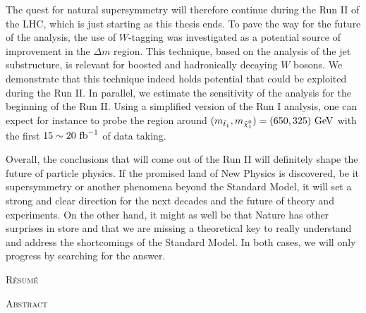 The quest for natural supersymmetry will therefore continue during the Run II of the LHC,
which is just starting as this thesis ends. To pave the way for the future
of the analysis, the use of $W$-tagging was investigated as a potential source of improvement
in the $\Delta m$ region. This technique, based on the analysis of the jet substructure, is
relevant for boosted and hadronically decaying $W$ bosons. We demonstrate that
this technique indeed holds potential that could be exploited during the Run II. In parallel,
 we estimate the sensitivity of the analysis for the beginning of the Run II. Using a
simplified version of the Run I analysis, one can expect for instance
to probe the region around $(m_{\tilde{t}_1},m_{\tilde{\chi}_1^0}) = (650,325)~\text{GeV}$
with the first $15\sim20~\text{fb}^{-1}$ of data taking.

Overall, the conclusions that will come out of the Run II will definitely shape the future
of particle physics. If the promised land of New Physics is discovered, be it supersymmetry
or another phenomena beyond the Standard Model, it will set a strong and clear direction
for the next decades and the future of theory and experiments. On the other hand, it might
as well be that Nature has other surprises in store and that we are missing a theoretical
key to really understand and address the shortcomings of the Standard Model. In both
cases, we will only progress by searching for the answer.


\newpage

\renewcommand{\leftmark}{Bibliography}

\begin{thebibliography}{2}

\singlespace



\end{thebibliography}

\newpage
\thispagestyle{empty}
\begin{center}\textsc{Résumé}\\\end{center}
\loremipsum
\begin{center}\textsc{Abstract}\\\end{center}
\loremipsum


